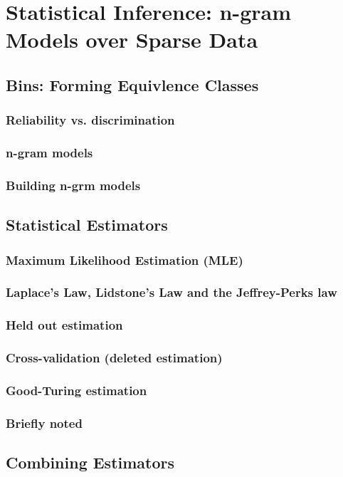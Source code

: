\documentclass[a4paper]{article}
\begin{document}
\section{Statistical Inference: n-gram Models over Sparse Data}
\subsection{Bins: Forming Equivlence Classes}
\subsubsection{Reliability vs. discrimination}
\subsubsection{n-gram models}
\subsubsection{Building n-grm models}
\subsection{Statistical Estimators}
\subsubsection{Maximum Likelihood Estimation (MLE)}
\subsubsection{Laplace's Law, Lidstone's Law and the Jeffrey-Perks law}
\subsubsection{Held out estimation}
\subsubsection{Cross-validation (deleted estimation)}
\subsubsection{Good-Turing estimation}
\subsubsection{Briefly noted}
\subsection{Combining Estimators}
\end{document}
